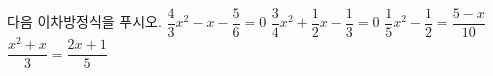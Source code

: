 다음 이차방정식을 푸시오.
 $\dfrac{4}{3}x^2-x-\dfrac{5}{6}=0$
 $\dfrac{3}{4}x^2+\dfrac{1}{2}x-\dfrac{1}{3}=0$
 $\dfrac{1}{5}x^2-\dfrac{1}{2}=\dfrac{5-x}{10}$
 $\dfrac{x^2+x}{3}=\dfrac{2x+1}{5}$
